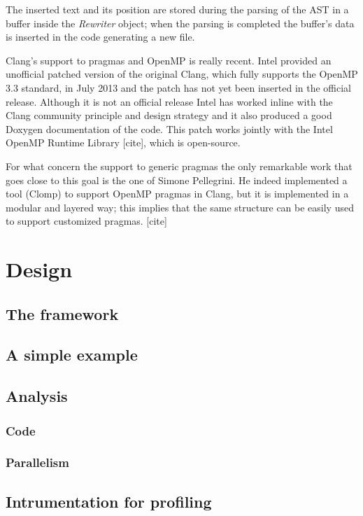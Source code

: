 \documentclass[a4paper,11pt,oneside]{book}
\begin{document}
The inserted text and its position are stored during the parsing of the AST in a buffer inside the \emph{Rewriter} object; when the parsing is completed the buffer’s data is inserted in the code generating a new file. 

Clang’s support to pragmas and OpenMP is really recent. Intel provided an unofficial patched version of the original Clang, which fully supports the OpenMP 3.3 standard, in July 2013 and the patch has not yet been inserted in the official release. Although it is not an official release Intel has worked inline with the Clang community principle and design strategy and it also produced a good Doxygen documentation of the code. This patch works jointly with the Intel OpenMP Runtime Library [cite], which is open-source. 

For what concern the support to generic pragmas the only remarkable work that goes close to this goal is the one of Simone Pellegrini. He indeed implemented a tool (Clomp) to support OpenMP pragmas in Clang, but it is implemented in a modular and layered way; this implies that the same structure can be easily used to support customized pragmas. [cite]
 












\chapter{Design}
\section{The framework}
\section{A simple example}
\section{Analysis}
\subsection{Code}
\subsection{Parallelism}
\section{Intrumentation for profiling}
\end{document}
